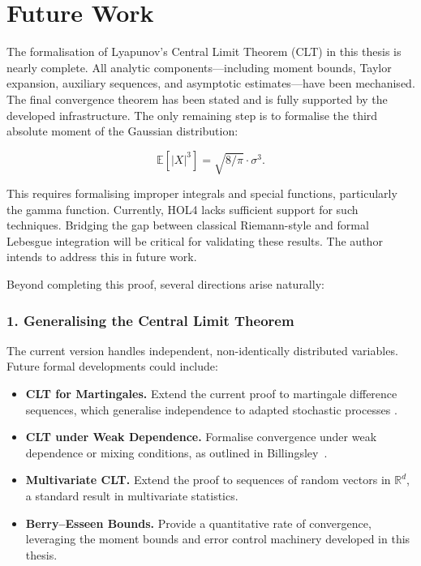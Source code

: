 \chapter{Future Work}
\label{future}

The formalisation of Lyapunov’s Central Limit Theorem (CLT) in this thesis is nearly complete. All analytic components—including moment bounds, Taylor expansion, auxiliary sequences, and asymptotic estimates—have been mechanised. The final convergence theorem has been stated and is fully supported by the developed infrastructure. The only remaining step is to formalise the third absolute moment of the Gaussian distribution:

\[
\mathbb{E}[|X|^3] = \sqrt{8/\pi} \cdot \sigma^3.
\]

This requires formalising improper integrals and special functions, particularly the gamma function. Currently, HOL4 lacks sufficient support for such techniques. Bridging the gap between classical Riemann-style and formal Lebesgue integration will be critical for validating these results. The author intends to address this in future work.

Beyond completing this proof, several directions arise naturally:

\subsection*{1. Generalising the Central Limit Theorem}

The current version handles independent, non-identically distributed variables. Future formal developments could include:

\begin{itemize}
\item \textbf{CLT for Martingales.} Extend the current proof to martingale difference sequences, which generalise independence to adapted stochastic processes \cite{hall2014martingale}.
\item \textbf{CLT under Weak Dependence.} Formalise convergence under weak dependence or mixing conditions, as outlined in Billingsley~\cite{billingsley2017probability}.
\item \textbf{Multivariate CLT.} Extend the proof to sequences of random vectors in \( \mathbb{R}^d \), a standard result in multivariate statistics.
\item \textbf{Berry–Esseen Bounds.} Provide a quantitative rate of convergence, leveraging the moment bounds and error control machinery developed in this thesis. \cite{berry1941accuracy}
\end{itemize}

